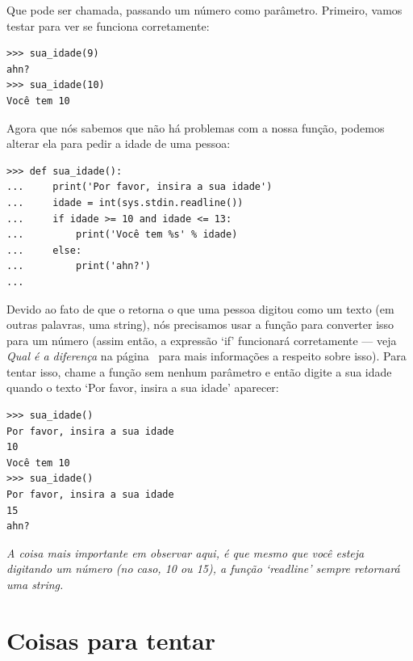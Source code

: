 Que pode ser chamada, passando um número como parâmetro. Primeiro, vamos testar para ver se funciona corretamente:

\begin{listing}
\begin{verbatim}
>>> sua_idade(9)
ahn?
>>> sua_idade(10)
Você tem 10
\end{verbatim}
\end{listing}

Agora que nós sabemos que não há problemas com a nossa função, podemos alterar ela para pedir a idade de uma pessoa:

\begin{listing}
\begin{verbatim}
>>> def sua_idade():
...     print('Por favor, insira a sua idade')
...     idade = int(sys.stdin.readline())
...     if idade >= 10 and idade <= 13:
...         print('Você tem %s' % idade)
...     else:
...         print('ahn?')
... 
\end{verbatim}
\end{listing}

Devido ao fato de que o  retorna o que uma pessoa digitou como um texto (em outras palavras, uma string), nós precisamos usar a função  para converter isso para um número (assim então, a expressão `if' funcionará corretamente --- veja \emph{Qual é a diferença} na página~\pageref{whatsthedifference} para mais informações a respeito sobre isso). Para tentar isso, chame a função  sem nenhum parâmetro e então digite a sua idade quando o texto `Por favor, insira a sua idade' aparecer:

\begin{listingignore}
\begin{verbatim}
>>> sua_idade()
Por favor, insira a sua idade
10
Você tem 10
>>> sua_idade()
Por favor, insira a sua idade
15
ahn?
\end{verbatim}
\end{listingignore}

\noindent
\emph{A coisa mais importante em observar aqui, é que mesmo que você esteja digitando um número (no caso, 10 ou 15), a função `readline' sempre retornará uma string.}


\section{Coisas para tentar}

